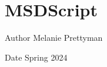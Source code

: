 \chapter{MSDScript}
\hypertarget{index}{}\label{index}
\begin{DoxyAuthor}{Author}
Melanie Prettyman 
\end{DoxyAuthor}
\begin{DoxyDate}{Date}
Spring 2024 
\end{DoxyDate}
